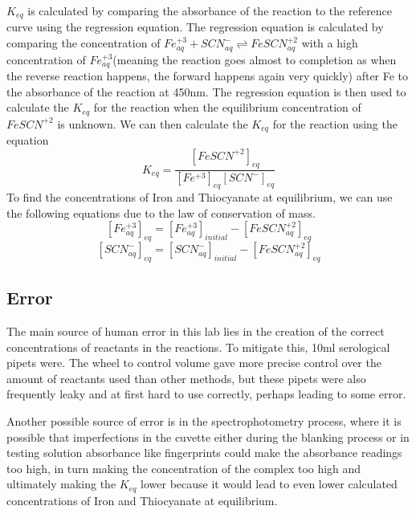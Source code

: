 \documentclass{article}
\begin{document}
$K_{eq}$ is calculated by comparing the absorbance of the reaction to the reference curve using the regression equation.  The regression equation is calculated by comparing the concentration of $Fe^{+3}_{aq} + SCN^-_{aq} \rightleftharpoons FeSCN^{+2}_{aq}$ with a high concentration of $Fe^{+3}_{aq}$(meaning the reaction goes almost to completion as when the reverse reaction happens, the forward happens again very quickly) after Fe to the absorbance of the reaction at 450nm.  The regression equation is then used to calculate the $K_{eq}$ for the reaction when the equilibrium concentration of $FeSCN^{+2}$ is unknown. We can then calculate the $K_{eq}$ for the reaction using the equation $$K_{eq} = \frac{[FeSCN^{+2}]_{eq}}{[Fe^{+3}]_{eq}[SCN^-]_{eq}}$$ To find the concentrations of Iron and Thiocyanate at equilibrium, we can use the following equations due to the law of conservation of mass.
$$[{Fe^{+3}_{aq}}]_{eq} = [{Fe^{+3}_{aq}}]_{initial} - [{FeSCN^{+2}_{aq}}]_{eq}$$
$$[{SCN^{-}_{aq}}]_{eq} = [{SCN^{-}_{aq}}]_{initial} - [{FeSCN^{+2}_{aq}}]_{eq}$$

\subsection{Error}

The main source of human error in this lab lies in the creation of the correct concentrations of reactants in the reactions.  To mitigate this, 10ml serological pipets were.  The wheel to control volume gave more precise control over the amount of reactants used than other methods, but these pipets were also frequently leaky and at first hard to use correctly, perhaps leading to some error.  

Another possible source of error is in the spectrophotometry process, where it is possible that imperfections in the cuvette either during the blanking process or in testing solution absorbance like fingerprints could make the absorbance readings too high, in turn making the concentration of the complex too high and ultimately making the $K_{eq}$ lower because it would lead to even lower calculated concentrations of Iron and Thiocyanate at equilibrium. 
\end{document}
